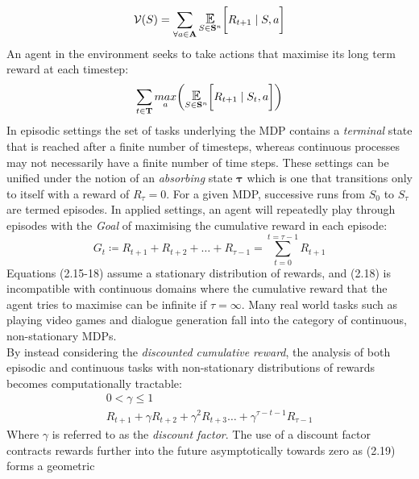 \begin{equation}
    { \displaystyle \mathcal{V}(S) = \sum_{\forall a \in \mathbf{A}} \E_{S \in \mathbf{S}^n}\biggl[R_{t+1} \; | \; S, a \biggl]}
\end{equation}
An agent in the environment seeks to take actions that maximise its long term reward at each timestep:
\begin{equation}
    \sum_{t \in \mathbf{T}}\underset{a}{max}\biggl(\E_{S \in \mathbf{S}^n}\biggl[R_{t+1} \; | \; S_t, a \biggl]\biggl)
\end{equation}
In episodic settings the set of tasks underlying the MDP contains a \emph{terminal} state that is reached after 
a finite number of timesteps, whereas continuous processes may not necessarily 
have a finite number of time steps. These settings can be unified under the notion of an \emph{absorbing} state $\mathbf{\tau}$
which is one that transitions only to itself with a reward of $R_\tau = 0$.
For a given MDP, successive runs from $S_0$ to $S_\tau$ are termed episodes. In applied settings, an agent
will repeatedly play through episodes with the \emph{Goal} of maximising the cumulative reward in each episode:
\begin{equation}
    G_t \coloneqq R_{t+1} + R_{t+2} + \hdots + R_{\tau-1} = \sum_{t=0}^{t=\tau - 1} R_{t+1}
\end{equation}
Equations (2.15-18) assume a stationary distribution of rewards, and (2.18) is incompatible with continuous domains where
the cumulative reward that the agent tries to maximise can be infinite if $\tau = \infty$. Many real world
tasks such as playing video games \cite{Mnih2015} and dialogue generation \cite{Weisz2018} fall into the category
of continuous, non-stationary MDPs.\\
By instead considering the \emph{discounted cumulative reward}, the analysis of both episodic and continuous 
tasks with non-stationary distributions of rewards becomes computationally tractable:
\begin{equation}
        \begin{gathered}
            0 < \gamma \leqslant 1  \\
            R_{t+1} + \gamma R_{t+2} + \gamma^2 R_{t+3} \hdots + \gamma^{\tau-t-1}R_{\tau-1}
        \end{gathered}
\end{equation}
Where $\gamma$ is referred to as the \emph{discount factor}. The use of a discount
factor contracts rewards further into the future asymptotically towards zero as (2.19) forms a geometric

